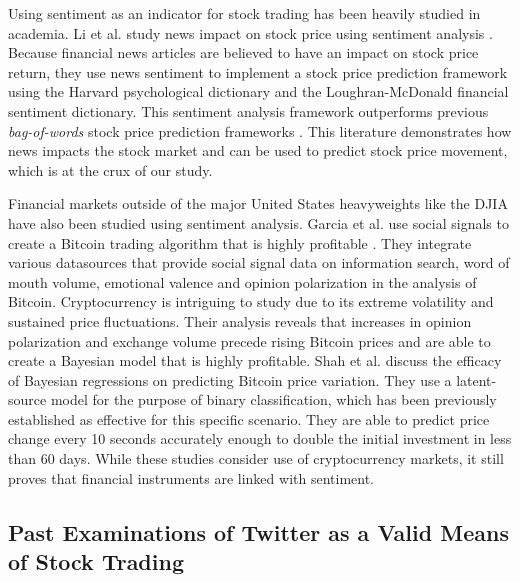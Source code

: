 \documentclass[../thesis.tex]{subfiles}
\begin{document}
Using sentiment as an indicator for stock trading has been heavily studied in academia. Li et al. study news impact on stock price using sentiment analysis \cite{Li2014}. Because financial news articles are believed to have an impact on stock price return, they use news sentiment to implement a stock price prediction framework using the Harvard psychological dictionary and the Loughran-McDonald financial sentiment dictionary. This sentiment analysis framework outperforms previous \textit{bag-of-words} stock price prediction frameworks  \cite{Li2014}. This literature demonstrates how news impacts the stock market and can be used to predict stock price movement, which is at the crux of our study. 

Financial markets outside of the major United States heavyweights like the DJIA have also been studied using sentiment analysis. Garcia et al. use social signals to create a Bitcoin trading algorithm that is highly profitable \cite{Garcia2015}. They integrate various datasources that provide social signal data on information search, word of mouth volume, emotional valence and opinion polarization in the analysis of Bitcoin. Cryptocurrency is intriguing to study due to its extreme volatility and sustained price fluctuations. Their analysis reveals that increases in opinion polarization and exchange volume precede rising Bitcoin prices and are able to create a Bayesian model that is highly profitable. Shah et al. \cite{Shah2014} discuss the efficacy of Bayesian regressions on predicting Bitcoin price variation. They use a latent-source model for the purpose of binary classification, which has been previously established as effective for this specific scenario. They are able to predict price change every 10 seconds accurately enough to double the initial investment in less than 60 days. While these studies consider use of cryptocurrency markets, it still proves that financial instruments are linked with sentiment.  

\subsection{Past Examinations of Twitter as a Valid Means of Stock Trading}
\end{document}
